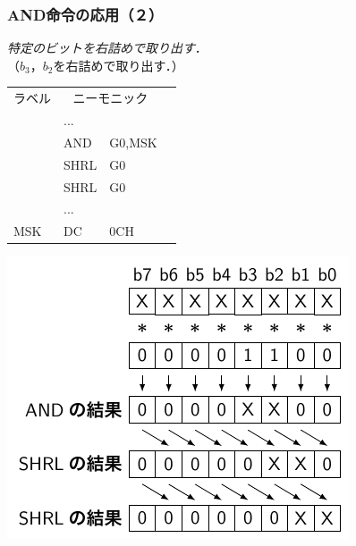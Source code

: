 \documentclass[handout]{beamer}        %
\begin{document}
\begin{frame}
  \frametitle{AND命令の応用（２）}
  \emph{特定のビットを右詰めで取り出す．} \\
  （$b_3$，$b_2$を右詰めで取り出す．）\\
  \begin{minipage}{0.48\columnwidth}
    {\small\ttfamily\begin{center}
      \begin{tabular}{|l|l l|l}
        \cline{1-3}
        ラベル & \multicolumn{2}{|c|}{ニーモニック} & \\
        \cline{1-3}
        & ...  &        & \\
        & AND  & G0,MSK & \\
        & SHRL & G0     & \\
        & SHRL & G0     & \\
        & ...  &        & \\
        MSK & DC   & 0CH    & \\
        \cline{1-3}
      \end{tabular}
    \end{center}}
  \end{minipage}
  \begin{minipage}{0.48\columnwidth}
    \centerline{\includegraphics[scale=0.8]{../Tikz/land2.pdf}}
  \end{minipage}
  \vfill
  \vfill
\end{frame}
\end{document}
